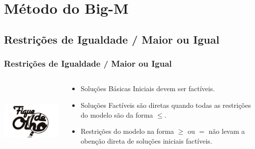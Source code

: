 \section{Método do Big-M}
\subsection{Restrições de Igualdade / Maior ou Igual }
\begin{frame}
	\frametitle{Restrições de Igualdade / Maior ou Igual}
	\begin{columns}
		\begin{column}{0.4\textwidth}
			\includegraphics[width=5cm,height=4cm]{fique-de-olho.jpg}
		\end{column}
		\begin{column}{0.5\textwidth}
			\begin{itemize}
			\item Soluções Básicas Iniciais devem ser factíveis.
			\item Soluções Factíveis são diretas quando todas as restrições do modelo são da forma $\le$.
			\item Restrições do modelo na forma $\ge$ ou $=$ não levam a obenção direta de soluções iniciais factíveis.
			\end{itemize}
		\end{column}
	\end{columns}
\end{frame}

